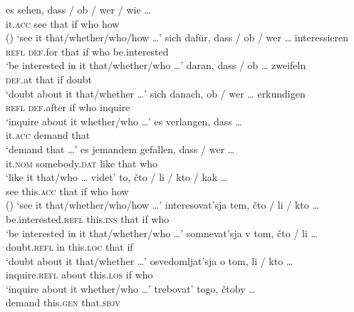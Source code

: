 \documentclass[output=paper]{langscibook}
\begin{document}
\ea\label{ex:zimmermann:3.1}
    \ea \gll es sehen, dass / ob / wer / wie {\dots} \\
    it.\textsc{acc} see that {} if {} who {} how \\ \hfill ()
    \glt `see it that/whether/who/how {\dots}'
    \ex \gll sich dafür, dass / ob / wer {\dots} interessieren \\
    \textsc{refl} \textsc{def}.for that {} if {} who {} be.interested \\
    \glt `be interested in it that/whether/who {\dots}'
    \ex \gll daran, dass / ob {\dots} zweifeln \\
    \textsc{def}.at that {} if {} doubt \\
    \glt `doubt about it that/whether {\dots}'
    \ex \gll sich danach, ob / wer {\dots} erkundigen \\
    \textsc{refl} \textsc{def}.after if {} who {} inquire \\
    \glt `inquire about it whether/who {\dots}'
    \ex \gll es verlangen, dass {\dots} \\
    it.\textsc{acc} demand that {} \\
    \glt `demand that {\dots}'
    \ex \gll es jemandem gefallen, dass / wer {\dots} \\
    it.\textsc{nom} somebody.\textsc{dat} like that {} who {} \\
    \glt `like it that/who {\dots}
\z\ex\label{ex:zimmermann:3.2}
    \ea \gll videt' to, čto / li / kto / kak {\dots} \\
    see this.\textsc{acc} that {} if {} who {} how {} \\ \hfill ()
    \glt `see it that/whether/who/how {\dots}'
    \ex \gll interesovat'sja tem, čto / li / kto {\dots} \\
    be.interested.\textsc{refl} this.\textsc{ins} that {} if {} who {} \\
    \glt `be interested in it that/whether/who {\dots}'
    \ex \gll somnevat'sja v tom, čto / li {\dots} \\
    doubt.\textsc{refl} in this.\textsc{loc} that {} if {} \\
    \glt `doubt about it that/whether {\dots}'
    \ex \gll osvedomljat'sja o tom, li / kto {\dots} \\
    inquire.\textsc{refl} about this.\textsc{los} if {} who {} \\
    \glt `inquire about it whether/who {\dots}'
    \ex \gll trebovat' togo, čtoby {\dots} \\
    demand this.\textsc{gen} that.\textsc{sbjv} {} \\
\end{document}
